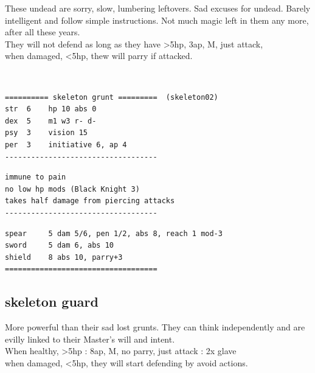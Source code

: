 These undead are sorry, slow, lumbering leftovers. Sad excuses for undead. Barely intelligent and follow simple instructions. Not much magic left in them any more, after all these years.\\
They will not defend as long as they have >5hp, 3ap, M, just attack,\\
when damaged, <5hp, thew will parry if attacked.

\

\small \begin{samepage} \begin{verbatim}
========== skeleton grunt =========  (skeleton02)
str  6    hp 10 abs 0
dex  5    m1 w3 r- d-
psy  3    vision 15
per  3    initiative 6, ap 4
-----------------------------------
\end{verbatim} \end{samepage} \goodbreak \begin{samepage} \begin{verbatim}
immune to pain
no low hp mods (Black Knight 3)
takes half damage from piercing attacks
-----------------------------------
\end{verbatim} \end{samepage} \goodbreak \begin{samepage} \begin{verbatim}
spear     5 dam 5/6, pen 1/2, abs 8, reach 1 mod-3
sword     5 dam 6, abs 10
shield    8 abs 10, parry+3
===================================
\end{verbatim} \end{samepage} \normalsize


\goodbreak 
\subsection*{skeleton guard}
\label{skeletonguard}

More powerful than their sad lost grunts. They can think independently and are evilly linked to their Master's will and intent.\\
When healthy, >5hp : 8ap, M, no parry, just attack : 2x glave\\
when damaged, <5hp, they will start defending by avoid actions.

\

